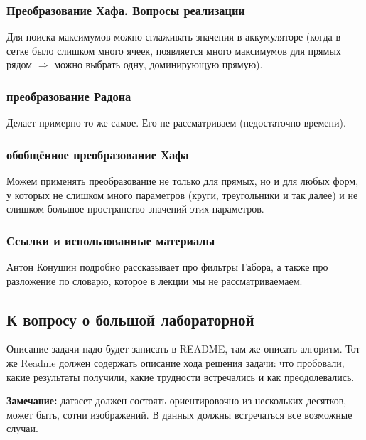 \documentclass[main.tex]{subfiles}
\begin{document}
\subsubsection{Преобразование Хафа. Вопросы реализации}

Для поиска максимумов можно сглаживать значения в аккумуляторе (когда в сетке было слишком много ячеек, появляется много максимумов для прямых рядом $ \Rightarrow $ можно выбрать одну, доминирующую прямую).

\subsubsection{преобразование Радона}

Делает примерно то же самое.
Его не рассматриваем (недостаточно времени).

\subsubsection{обобщённое преобразование Хафа}

Можем применять преобразование не только для прямых, но и для любых форм, у которых не слишком много параметров (круги, треугольники и так далее) и не слишком большое пространство значений этих параметров.

\subsubsection{Ссылки и использованные материалы}

Антон Конушин подробно рассказывает про фильтры Габора, а также про разложение по словарю, которое в лекции мы не рассматриваемаем.

\subsection{К вопросу о большой лабораторной}

Описание задачи надо будет записать в README, там же описать алгоритм.
Тот же Readme должен содержать описание хода решения задачи: что пробовали, какие результаты получили, какие трудности встречались и как преодолевались.

\textbf{Замечание:} датасет должен состоять ориентировочно из нескольких десятков, может быть, сотни изображений.
В данных должны встречаться все возможные случаи.
\end{document}

